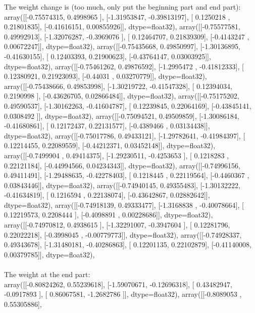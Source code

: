 \documentclass{article}
\begin{document}
The  weight  change is (too much, only put the beginning part and end part):\\
array([[-0.75574315,  0.4998965 ],
       [-1.31953847, -0.39813197],
       [ 0.1250218 ,  0.21801835],
       [-0.41616151,  0.00855926]], dtype=float32), array([[-0.75577581,  0.49992913],
       [-1.32076287, -0.3969076 ],
       [ 0.12464707,  0.21839309],
       [-0.4143247 ,  0.00672247]], dtype=float32), array([[-0.75435668,  0.49850997],
       [-1.30136895, -0.41630155],
       [ 0.12403393,  0.21900623],
       [-0.43764147,  0.03003925]], dtype=float32), array([[-0.75461262,  0.49876592],
       [-1.2995472 , -0.41812333],
       [ 0.12380921,  0.21923093],
       [-0.44031   ,  0.03270779]], dtype=float32), array([[-0.75438666,  0.49853998],
       [-1.30219722, -0.41547328],
       [ 0.12394034,  0.2190998 ],
       [-0.43626705,  0.02866484]], dtype=float32), array([[-0.75175202,  0.49590537],
       [-1.30162263, -0.41604787],
       [ 0.12239845,  0.22064169],
       [-0.43845141,  0.0308492 ]], dtype=float32), array([[-0.75094521,  0.49509859],
       [-1.30086184, -0.41680861],
       [ 0.12172437,  0.22131577],
       [-0.4389466 ,  0.03134438]], dtype=float32), array([[-0.75017786,  0.49433121],
       [-1.29782641, -0.41984397],
       [ 0.12214455,  0.22089559],
       [-0.44212371,  0.03452148]], dtype=float32), array([[-0.7499904 ,  0.49414375],
       [-1.29230511, -0.4253653 ],
       [ 0.1218283 ,  0.22121184],
       [-0.44994566,  0.04234343]], dtype=float32), array([[-0.74996156,  0.49411491],
       [-1.29488635, -0.42278403],
       [ 0.1218445 ,  0.22119564],
       [-0.4460367 ,  0.03843446]], dtype=float32), array([[-0.74940145,  0.49355483],
       [-1.30132222, -0.41634819],
       [ 0.1216594 ,  0.22138074],
       [-0.43642867,  0.02882642]], dtype=float32), array([[-0.74918139,  0.49333477],
       [-1.3168838 , -0.40078664],
       [ 0.12219573,  0.2208444 ],
       [-0.4098891 ,  0.00228686]], dtype=float32), array([[-0.74970812,  0.4938615 ],
       [-1.32291007, -0.3947604 ],
       [ 0.12281796,  0.22022218],
       [-0.3998045 , -0.00779773]], dtype=float32), array([[-0.74928337,  0.49343678],
       [-1.31480181, -0.40286863],
       [ 0.12201135,  0.22102879],
       [-0.41140008,  0.00379785]], dtype=float32),
\\
\\
The weight at the end part:\\
 array([[-0.80824262,  0.55239618],
       [-1.59070671, -0.12696318],
       [ 0.43482947, -0.0917893 ],
       [ 0.86067581, -1.2682786 ]], dtype=float32), array([[-0.8089053 ,  0.55305886],
\end{document}
